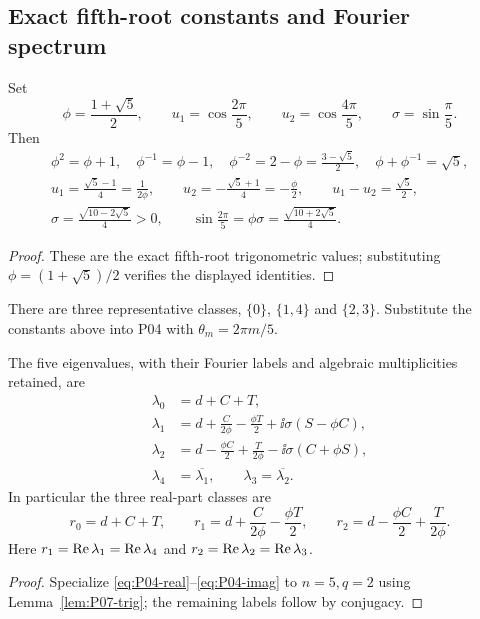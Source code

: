 \subsection{Exact fifth-root constants and Fourier spectrum}
\label{slot:P07-1}
\begin{lemma}
\label{lem:P07-trig}
Set
\begin{equation}
 \phi=\frac{1+\sqrt5}{2},\qquad
 u_1=\cos\frac{2\pi}{5},\qquad u_2=\cos\frac{4\pi}{5},\qquad
 \sigma=\sin\frac\pi5.
 \label{eq:P07-constants}
\end{equation}
Then
\begin{gather}
 \phi^2=\phi+1,\quad \phi^{-1}=\phi-1,\quad
 \phi^{-2}=2-\phi=\frac{3-\sqrt5}{2},\quad
 \phi+\phi^{-1}=\sqrt5,\label{eq:P07-phi}\\
 u_1=\frac{\sqrt5-1}{4}=\frac1{2\phi},\qquad
 u_2=-\frac{\sqrt5+1}{4}=-\frac\phi2,\qquad
 u_1-u_2=\frac{\sqrt5}{2},\label{eq:P07-cosines}\\
 \sigma=\frac{\sqrt{10-2\sqrt5}}4>0,\qquad
 \sin\frac{2\pi}{5}=\phi\sigma
       =\frac{\sqrt{10+2\sqrt5}}4.\label{eq:P07-sines}
\end{gather}
\end{lemma}
\begin{proof}
These are the exact fifth-root trigonometric values; substituting
$\phi=(1+\sqrt5)/2$ verifies the displayed identities.
\end{proof}


There are three representative classes, $\{0\}$, $\{1,4\}$ and
$\{2,3\}$. Substitute the constants above into P04 with
$\theta_m=2\pi m/5$.

\begin{theorem}
\label{thm:P07-spectrum}
The five eigenvalues, with their Fourier labels and algebraic
multiplicities retained, are
\begin{align}
 \lambda_0&=d+C+T,\label{eq:P07-spectrum}\\
 \lambda_1&=d+\frac{C}{2\phi}-\frac{\phi T}{2}
                +\ii\sigma(S-\phi C),\nonumber\\
 \lambda_2&=d-\frac{\phi C}{2}+\frac{T}{2\phi}
                -\ii\sigma(C+\phi S),\nonumber\\
 \lambda_4&=\overline{\lambda_1},\qquad
 \lambda_3=\overline{\lambda_2}.\nonumber
\end{align}
In particular the three real-part classes are
\begin{equation}
 r_0=d+C+T,\qquad
 r_1=d+\frac{C}{2\phi}-\frac{\phi T}{2},\qquad
 r_2=d-\frac{\phi C}{2}+\frac{T}{2\phi}.
 \label{eq:P07-real}
\end{equation}
Here $r_1=\operatorname{Re}\lambda_1=\operatorname{Re}\lambda_4$ and
$r_2=\operatorname{Re}\lambda_2=\operatorname{Re}\lambda_3$.
\end{theorem}
\begin{proof}
Specialize \eqref{eq:P04-real}--\eqref{eq:P04-imag} to $n=5,q=2$
using Lemma~\ref{lem:P07-trig}; the remaining labels follow by conjugacy.
\end{proof}

